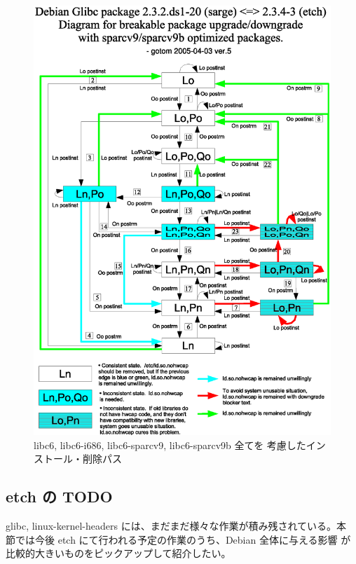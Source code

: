 \documentclass[mingoth,a4paper]{jsarticle}
\begin{document}
        \begin{figure}
        \begin{center}
        \includegraphics[scale=0.8,angle=0]{image200507/opt-crash.eps}
        \caption{libc6, libc6-i686, libc6-sparcv9, libc6-sparcv9b 全てを
	 考慮したインストール・削除パス}
        \label{opt-crash-sparc}
        \end{center}
	\end{figure}

\subsection{etch の TODO}

  glibc, linux-kernel-headers には、まだまだ様々な作業が積み残されている。本
  節では今後 etch にて行われる予定の作業のうち、Debian 全体に与える影響
  が比較的大きいものをピックアップして紹介したい。
\end{document}
